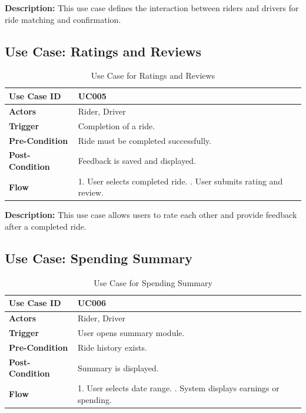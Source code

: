 \noindent
\textbf{Description:} This use case defines the interaction between riders and drivers for ride matching and confirmation.




\subsection{Use Case: Ratings and Reviews}

\begin{table}[H]
\centering

\label{tab:usecase-ratings}
\renewcommand{\arraystretch}{1.2}
\begin{tabular}{|>{\bfseries}l|p{10cm}|}
\hline
Use Case ID & UC005 \\ \hline
Actors & Rider, Driver \\ \hline
Trigger & Completion of a ride. \\ \hline
Pre-Condition & Ride must be completed successfully. \\ \hline
Post-Condition & Feedback is saved and displayed. \\ \hline
Flow &
1. User selects completed ride. \newline
2. User submits rating and review. \\ \hline
\end{tabular}
\caption{Use Case for Ratings and Reviews}
\end{table}

\noindent
\textbf{Description:} This use case allows users to rate each other and provide feedback after a completed ride.


\subsection{Use Case: Spending Summary}

\begin{table}[H]
\centering

\label{tab:usecase-summary}
\renewcommand{\arraystretch}{1.2}
\begin{tabular}{|>{\bfseries}l|p{10cm}|}
\hline
Use Case ID & UC006 \\ \hline
Actors & Rider, Driver \\ \hline
Trigger & User opens summary module. \\ \hline
Pre-Condition & Ride history exists. \\ \hline
Post-Condition & Summary is displayed. \\ \hline
Flow &
1. User selects date range. \newline
2. System displays earnings or spending. \\ \hline
\end{tabular}
\caption{Use Case for Spending Summary}
\end{table}

